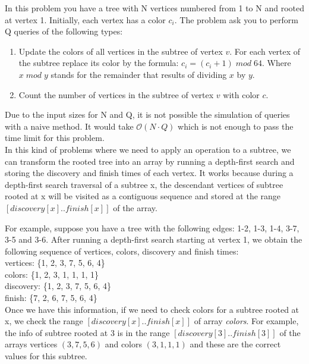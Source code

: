 % 

In this problem you have a tree with N vertices numbered from 1 to N and rooted at vertex 1. Initially, each vertex has a color $c_i$. The problem ask you to perform Q queries of the following types:

\begin{enumerate}
	\item Update the colors of all vertices in the subtree of vertex $v$. For each vertex of the subtree replace its color by the formula: $c_i = (c_i + 1) \; mod \; 64$. Where $x \; mod \; y$ stands for the remainder that results of dividing $x$ by $y$.
	\item Count the number of vertices in the subtree of vertex $v$ with color $c$.
\end{enumerate}

Due to the input sizes for N and Q, it is not possible the simulation of queries with a naive method. It would take $\mathcal{O}(N \cdot Q)$ which is not enough to pass the time limit for this problem.\\

In this kind of problems where we need to apply an operation to a subtree, we can transform the rooted tree into an array by running a depth-first search and storing the discovery and finish times of each vertex. It works because during a depth-first search traversal of a subtree x, the descendant vertices of subtree rooted at x will be visited as a contiguous sequence and stored at the range $[discovery[x] ..finish[x]]$ of the array.

For example, suppose you have a tree with the following edges: 1-2, 1-3, 1-4, 3-7, 3-5 and 3-6. After running a depth-first search starting at vertex 1, we obtain the following sequence of vertices, colors, discovery and finish times:\\
vertices: \{1, 2, 3, 7, 5, 6, 4\}\\
colors: \{1, 2, 3, 1, 1, 1, 1\}\\
discovery: \{1, 2, 3, 7, 5, 6, 4\}\\
finish: \{7, 2, 6, 7, 5, 6, 4\}\\

Once we have this information, if we need to check colors for a subtree rooted at x, we check the range $[discovery[x]..finish[x]]$ of array \textit{colors}. For example, the info of subtree rooted at 3 is in the range $[discovery[3]..finish[3]]$ of the arrays vertices $(3, 7, 5, 6)$ and colors $(3, 1, 1, 1)$ and these are the correct values for this subtree.

